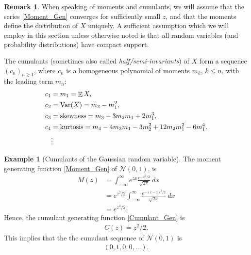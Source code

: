 \documentclass[letterpaper,11pt,oneside,reqno]{amsart}
\numberwithin{equation}{section}
\DeclareMathOperator{\EE}{\mathbb{E}}
\DeclareMathOperator{\VAR}{\mathrm{Var}}
\theoremstyle{definition}
\newtheorem{remark}[proposition]{Remark}
\newtheorem{example}[proposition]{Example}
\begin{document}
\begin{remark}
	When speaking of moments and cumulants, we will assume that the series \eqref{Moment_Gen} 
	converges for sufficiently small $z$, and that the moments define the distribution of $X$
	uniquely. A sufficient assumption which we will employ in this section unless otherwise
	noted is that all random variables (and probability distributions)
	have compact support.
\end{remark}

The cumulants (sometimes also called \emph{half/semi-invariants}) of $X$ form a sequence $(c_n)_{n\ge1}$, where $c_n$ is a homogeneous polynomial of moments $m_k$, $k\leq n$, with the leading term $m_n$:
\begin{equation}\label{skewness_kurtosis}
	\begin{split}
		c_1&=m_1=\EE X,\\
		c_2&=\VAR(X)=m_2-m_1^2,\\
		c_3&=\textnormal{skewness}=m_3-3m_2m_1+2m_1^3,\\
		c_4&=\textnormal{kurtosis}=m_4-4m_3m_1-3m_2^2+12m_2m_1^2-6m_1^4,\\
		&\vdots
	\end{split}
\end{equation}

\begin{example}[Cumulants of the Gaussian random variable]\label{ex:Cumulant_Seq_Ga}
	The moment generating function \eqref{Moment_Gen} of $\mathcal{N}(0,1)$, is 
	\begin{align*}
	    M(z)&= \int_{-\infty}^\infty e^{zx} \frac{e^{-x^2/2}}{\sqrt{2\pi}}\ dx\\
	    &=e^{z^2/2}\int_{-\infty}^\infty \frac{e^{-(x-z)^2/2}}{\sqrt{2\pi}}\ dx\\
	    &=e^{z^2/2}.
	\end{align*}
	Hence, the cumulant generating function \eqref{Cumulant_Gen} is 
	\begin{align*}
	    C(z)=z^2/2.
	\end{align*}
	This implies that the the cumulant sequence of $\mathcal{N}(0,1)$ is 
	\begin{align}\label{Cumulant_Seq_Ga}
	    (0, 1, 0, 0, ...).
	\end{align}
\end{example}
\end{document}
